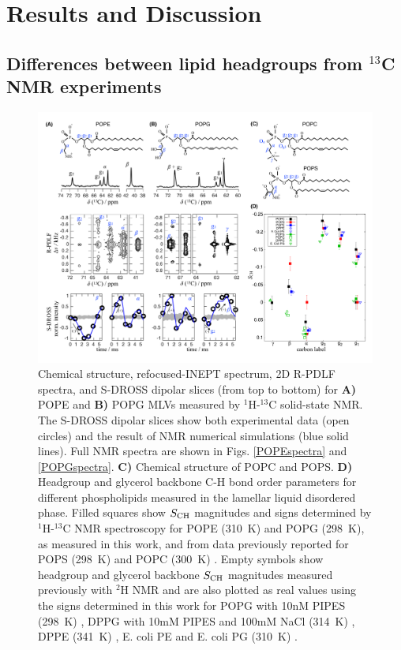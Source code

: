 \documentclass[journal=jpcbfk,manuscript=article]{achemso}
\begin{document}
\section{Results and Discussion}

\subsection{Differences between lipid headgroups from $^{13}$C NMR experiments}

\begin{figure}[]
  \centering
   \includegraphics[width=\textwidth]{./Figs/figure_PG_PE.pdf}
   \caption{\label{HGorderParameters}
     Chemical structure, refocused-INEPT spectrum, 2D R-PDLF spectra, and S-DROSS dipolar slices (from top to bottom) for \textbf{A)} POPE  and \textbf{B)} POPG MLVs measured by $^1$H-$^{13}$C solid-state NMR. The S-DROSS dipolar slices show both experimental data (open circles) and the result of NMR numerical simulations (blue solid lines).
     Full NMR spectra are shown in Figs. \ref{POPEspectra} and \ref{POPGspectra}.
     \textbf{C)} Chemical structure of POPC and POPS.
    \textbf{D)} Headgroup and glycerol backbone C-H bond order parameters for different phospholipids measured in the lamellar liquid disordered phase.
    Filled squares show $S_{\rm{CH}}$ magnitudes and signs determined by $^1$H-$^{13}$C NMR spectroscopy for POPE (310~K) and POPG (298~K), as
    measured in this work, and from data previously reported for POPS (298~K) \cite{antila19} and POPC (300~K) \cite{ferreira13,ferreira16}. Empty symbols show headgroup and glycerol backbone $S_{\rm{CH}}$ magnitudes measured previously with $^2$H NMR and are also plotted as real values using the signs determined in this work for 
    POPG with 10nM PIPES (298~K) \cite{borle85},
    DPPG with 10mM PIPES and 100mM NaCl (314~K) \cite{wohlgemuth80}, 
    DPPE (341~K) \cite{seelig76},
    E. coli PE and E. coli PG (310~K) \cite{gally81}
    .
   }
\end{figure}
\end{document}
